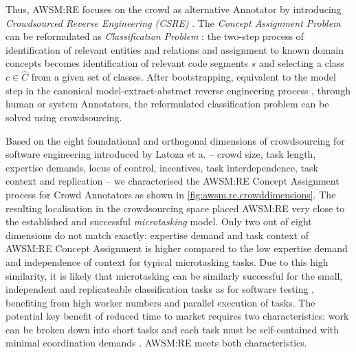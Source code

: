 Thus, AWSM:RE focuses on the crowd as alternative Annotator by introducing \emph{Crowdsourced Reverse Engineering (CSRE)} \autocite{Heil2018CSRE,Heil2019CSRECCIS}.
The \emph{Concept Assignment Problem} \autocite{Biggerstaff1993ConceptAssignmentICSE} can be reformulated as \emph{Classification Problem} \autocite{Heil2018CSRE,Heil2019CSRECCIS}: the two-step process of identification of relevant entities and relations and assignment to known domain concepts \autocite{Biggerstaff1993ConceptAssignmentICSE} becomes identification of relevant code segments \(s\) and selecting a class \(c \in \hat C\) from a given set of classes.
After bootstrapping, equivalent to the model step in the canonical model-extract-abstract reverse engineering process \autocite{Tilley1996ProgramUnderstanding}, through human or system Annotators, the reformulated classification problem can be solved using crowdsourcing.

Based on the eight foundational and orthogonal dimensions of crowdsourcing for software engineering introduced by Latoza et a.
\autocite{Latoza2016} -- crowd size, task length, expertise demands, locus of control, incentives, task interdependence, task context and replication -- we characterised the AWSM:RE Concept Assignment process for Crowd Annotators as shown in \cref{fig:awsm.re.crowddimensions}.
The resulting localisation in the crowdsourcing space placed AWSM:RE very close to the established and successful \emph{microtasking} model.
Only two out of eight dimensions do not match exactly: expertise demand and task context of AWSM:RE Concept Assignment is higher compared to the low expertise demand and independence of context for typical microtasking tasks.
Due to this high similarity, it is likely that microtasking can be similarly successful for the small, independent and replicateable classification tasks as for software testing \autocite{Latoza2016}, benefiting from high worker numbers and parallel execution of tasks.
The potential key benefit of reduced time to market requires two characteristics: work can be broken down into short tasks and each task must be self-contained with minimal coordination demands \autocite{Latoza2016}.
AWSM:RE meets both characteristics.

